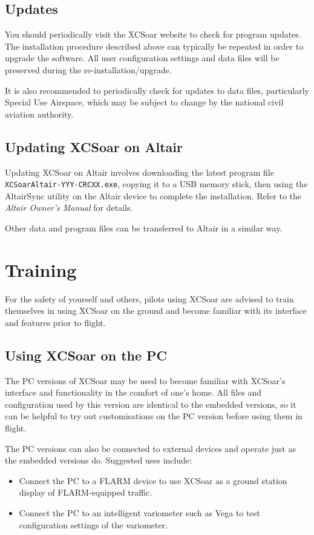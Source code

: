 \subsection*{Updates}
You should periodically visit the XCSoar website to check for program
updates. The installation procedure described above can typically be
repeated in order to upgrade the software.  All user configuration
settings and data files will be preserved during the
re-installation/upgrade.

It is also recommended to periodically check for updates to data
files, particularly Special Use Airspace, which may be subject to
change by the national civil aviation authority.

\subsection*{Updating XCSoar on Altair}
Updating XCSoar on Altair involves downloading the latest program file
{\tt XCSoarAltair-YYY-CRCXX.exe}, copying it to a USB memory stick,
then using the AltairSync utility on the Altair device to complete the
installation.  Refer to the {\em Altair Owner's Manual} for details.

Other data and program files can be transferred to Altair in a similar
way.

\section{Training}
For the safety of yourself and others, pilots using XCSoar are advised to
train themselves in using XCSoar on the ground and become familiar with its
interface and features prior to flight.

\subsection*{Using XCSoar on the PC}
The PC versions of XCSoar may be used to become familiar with XCSoar's
interface and functionality in the comfort of one's home.  All files
and configuration used by this version are identical to the embedded versions,
so it can be helpful to try out customisations on the PC version before using
them in flight.

The PC versions can also be connected to external devices and operate just as
the embedded versions do. Suggested uses include:
\begin{itemize}
\item Connect the PC to a FLARM device to use XCSoar as a ground
station display of FLARM-equipped traffic.
\item Connect the PC to an intelligent variometer such as Vega to
test configuration settings of the variometer.
\end{itemize}

